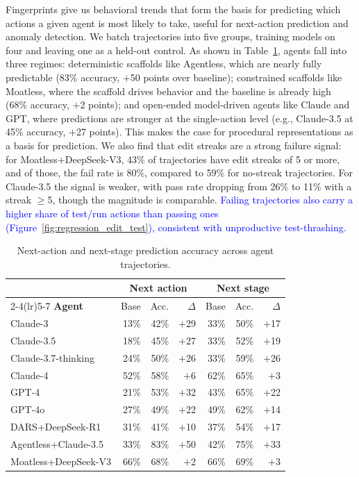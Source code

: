 \documentclass[12pt]{article}
\begin{document}
Fingerprints give us behavioral trends that form the basis for predicting which actions a given agent is most likely to take, useful for next-action prediction and anomaly detection. We batch trajectories into five groups, training models on four and leaving one as a held-out control. As shown in Table~\ref{tab:trajectory_holdouts}, agents fall into three regimes: deterministic scaffolds like Agentless, which are nearly fully predictable (83\% accuracy, $+$50 points over baseline); constrained scaffolds like Moatless, where the scaffold drives behavior and the baseline is already high (68\% accuracy, $+$2 points); and open-ended model-driven agents like Claude and GPT, where predictions are stronger at the single-action level (e.g., Claude-3.5 at 45\% accuracy, $+$27 points). This makes the case for procedural representations as a basis for prediction. We also find that edit streaks are a strong failure signal: for Moatless+DeepSeek-V3, 43\% of trajectories have edit streaks of 5 or more, and of those, the fail rate is 80\%, compared to 59\% for no-streak trajectories. For Claude-3.5 the signal is weaker, with pass rate dropping from 26\% to 11\% with a streak $\geq$5, though the magnitude is comparable. \textcolor{blue}{Failing trajectories also carry a higher share of test/run actions than passing ones (Figure~\ref{fig:regression_edit_test}), consistent with unproductive test-thrashing.}

\begin{table}[H]
\centering\small\setlength{\tabcolsep}{4pt}
\begin{tabular}{lrrrrrr}
\toprule
& \multicolumn{3}{c}{\textbf{Next action}} & \multicolumn{3}{c}{\textbf{Next stage}} \\
\cmidrule(lr){2-4}\cmidrule(lr){5-7}
\textbf{Agent} & Base & Acc. & $\Delta$ & Base & Acc. & $\Delta$ \\
\midrule
\rowcolor{claudebg} Claude-3              & 13\% & 42\% & $+$29 & 33\% & 50\% & $+$17 \\
\rowcolor{claudebg} Claude-3.5            & 18\% & 45\% & $+$27 & 33\% & 52\% & $+$19 \\
\rowcolor{claudebg} Claude-3.7-thinking   & 24\% & 50\% & $+$26 & 33\% & 59\% & $+$26 \\
\rowcolor{claudebg} Claude-4              & 52\% & 58\% & $+$6  & 62\% & 65\% & $+$3  \\
\midrule
\rowcolor{gptbg} GPT-4                 & 21\% & 53\% & $+$32 & 43\% & 65\% & $+$22 \\
\rowcolor{gptbg} GPT-4o                & 27\% & 49\% & $+$22 & 49\% & 62\% & $+$14 \\
\midrule
\rowcolor{owbg} DARS+DeepSeek-R1      & 31\% & 41\% & $+$10 & 37\% & 54\% & $+$17 \\
\rowcolor{owbg} Agentless+Claude-3.5  & 33\% & 83\% & $+$50 & 42\% & 75\% & $+$33 \\
\rowcolor{owbg} Moatless+DeepSeek-V3  & 66\% & 68\% & $+$2  & 66\% & 69\% & $+$3  \\
\bottomrule
\end{tabular}
\caption{Next-action and next-stage prediction accuracy across agent trajectories.}
\label{tab:trajectory_holdouts}
\end{table}
\end{document}
